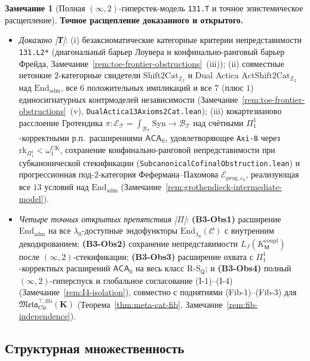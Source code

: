 \documentclass[11pt]{article}
\theoremstyle{plain}
\theoremstyle{definition}
\newtheorem{remark}[theorem]{Замечание}
\newcommand{\RS}{\mathrm{R\text{-}S}}
\newcommand{\cC}{\mathcal{C}}
\newcommand{\Meta}{\mathfrak{Meta}}
\newcommand{\Syn}{\mathrm{Syn}}
\begin{document}
\begin{remark}[Полная $(\infty,2)$-гиперстек-модель \texttt{131.T} и точное эпистемическое расщепление]
\medskip\noindent\textbf{Точное расщепление доказанного и открытого.}
\begin{itemize}[nosep]
\item \emph{Доказано \textup{[\textbf{Т}]}}:
  (i) безаксиоматические категорные критерии непредставимости \texttt{131.L2*} (диагональный барьер Лоувера и конфинально-ранговый барьер Фрейда, Замечание~\ref{rem:toe-frontier-obstructions}~(iii));
  (ii) совместные нетонкие $2$-категорные свидетели $\mathrm{Shift2Cat}_{\mathbb{Z}_2}$ и Dual Actica $\mathrm{ActShift2Cat}_{\mathbb{Z}_2}$ над $\mathrm{End}_{\mathrm{adm}}$, все $6$ положительных импликаций и все $7$ (плюс $1$) единосигнатурных контрмоделей независимости (Замечание~\ref{rem:toe-frontier-obstructions}~(v), \texttt{DualActica13Axioms2Cat.lean});
  (iii) кокартезианово расслоение Гротендика $\pi : \mathcal{E}_{\mathcal{T}} = \int_{\mathcal{B}_{\mathcal{T}}} \Syn \to \mathcal{B}_{\mathcal{T}}$ над счётными $\Pi_1^1$-корректными р.п.\ расширениями $\mathsf{ACA}_0$, удовлетворяющее \texttt{Axi-8} через $\mathrm{rk}_{\Pi_1^1} < \omega_1^{\mathrm{CK}}$, сохранение конфинально-ранговой непредставимости при субканонической стекификации (\texttt{SubcanonicalCofinalObstruction.lean}) и прогрессионная под-$2$-категория Фефермана--Пахомова $\mathcal{E}_{\mathrm{prog}, \varepsilon_0}$, реализующая все $13$ условий над $\mathrm{End}_{\mathrm{adm}}$ (Замечание~\ref{rem:grothendieck-intermediate-model}).
\item \emph{Четыре точных открытых препятствия \textup{[\textbf{$\Pi$}]}}: \textbf{(B3-Obs1)} расширение $\mathrm{End}_{\mathrm{adm}}$ на все $\lambda_0$-доступные эндофункторы $\mathrm{End}_{\lambda_0}(\cC)$ с внутренним декодированием; \textbf{(B3-Obs2)} сохранение непредставимости $L_J(K_{\mathsf{M}}^{\mathrm{coupl}})$ после $(\infty,2)$-стекификации; \textbf{(B3-Obs3)} расширение охвата с $\Pi_1^1$-корректных расширений $\mathsf{ACA}_0$ на весь класс $\RS_{\mathsf{Q}}$; и \textbf{(B3-Obs4)} полный $(\infty,2)$-гиперспуск и глобальное согласование \textup{(I-1)--(I-4)} (Замечание~\ref{rem:I4-isolation}), совместно с поднятиями \textup{(Fib-1)--(Fib-3)} для $\Meta_{\mathrm{Cls}}^{\top,\mathrm{fib}}(\mathbf{K})$ (Теорема~\ref{thm:meta-cat-fib}, Замечание~\ref{rem:fib-independence}).
\end{itemize}
\end{remark}

\subsection{Структурная множественность}
\end{document}
